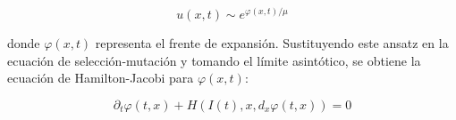 \documentclass{article}
\begin{document}
{            \begin{equation*}
                u(x, t) \sim e^{\varphi(x, t)/\mu}
            \end{equation*}
                
            \normalsize{donde $\varphi(x,t)$ representa el frente de expansión. Sustituyendo este ansatz en la ecuación de selección-mutación y tomando el límite asintótico, se obtiene la ecuación de Hamilton-Jacobi para \( \varphi(x, t) \):}

            \begin{equation*}
                \partial_t \varphi(t, x)+H\left(I(t), x, d_x \varphi(t, x)\right)=0
            \end{equation*}
            
            }

            
\end{document}
